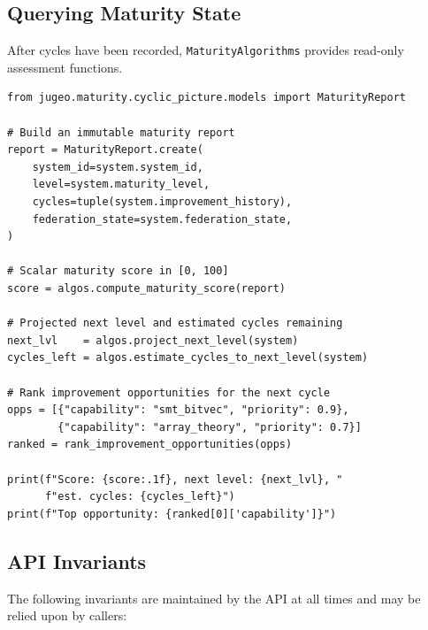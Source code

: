 \documentclass[11pt]{article}
\begin{document}
\subsection{Querying Maturity State}

After cycles have been recorded, \texttt{MaturityAlgorithms} provides
read-only assessment functions.

\begin{lstlisting}[style=jugeo-python,
  caption={Maturity assessment and projection.}]
from jugeo.maturity.cyclic_picture.models import MaturityReport

# Build an immutable maturity report
report = MaturityReport.create(
    system_id=system.system_id,
    level=system.maturity_level,
    cycles=tuple(system.improvement_history),
    federation_state=system.federation_state,
)

# Scalar maturity score in [0, 100]
score = algos.compute_maturity_score(report)

# Projected next level and estimated cycles remaining
next_lvl    = algos.project_next_level(system)
cycles_left = algos.estimate_cycles_to_next_level(system)

# Rank improvement opportunities for the next cycle
opps = [{"capability": "smt_bitvec", "priority": 0.9},
        {"capability": "array_theory", "priority": 0.7}]
ranked = rank_improvement_opportunities(opps)

print(f"Score: {score:.1f}, next level: {next_lvl}, "
      f"est. cycles: {cycles_left}")
print(f"Top opportunity: {ranked[0]['capability']}")
\end{lstlisting}

\subsection{API Invariants}

The following invariants are maintained by the API at all times and may be
relied upon by callers:
\end{document}
